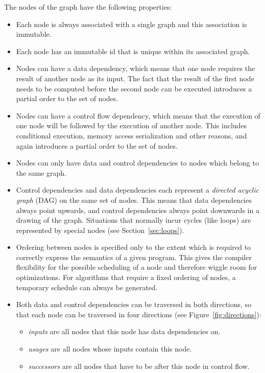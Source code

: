 \documentclass[twocolumn]{svjour3}
\begin{document}
The nodes of the graph have the following properties:
\begin{itemize}
    \item Each node is always associated with a single graph and this association is immutable.
    \item Each node has an immutable id that is unique within its associated graph.
    \item Nodes can have a data dependency, which means that one node requires the result of another node as its input. The fact that the result of the first node needs to be computed before the second node can be executed introduces a partial order to the set of nodes.
    \item Nodes can have a control flow dependency, which means that the execution of one node will be followed by the execution of another node. This includes conditional execution, memory access serialization and other reasons, and again introduces a partial order to the set of nodes.
    \item Nodes can only have data and control dependencies to nodes which belong to the same graph.
    \item Control dependencies and data dependencies each represent a \emph{directed acyclic graph} (DAG) on the same set of nodes. This means that data dependencies always point upwards, and control dependencies always point downwards in a drawing of the graph. Situations that normally incur cycles (like loops) are represented by special nodes (see Section~\ref{sec:loops}).
	\item Ordering between nodes is specified only to the extent which is required to correctly express the semantics of a given program. This gives the compiler flexibility for the possible scheduling of a node and therefore wiggle room for optimizations. For algorithms that require a fixed ordering of nodes, a temporary schedule can always be generated.
    \item Both data and control dependencies can be traversed in both directions, so that each node can be traversed in four directions (see Figure~\ref{fig:directions}):
    \begin{itemize}
        \item \emph{inputs} are all nodes that this node has data dependencies on.
        \item \emph{usages} are all nodes whose inputs contain this node.
        \item \emph{successors} are all nodes that have to be after this node in control flow.

\end{itemize}
\end{itemize}
\end{document}

